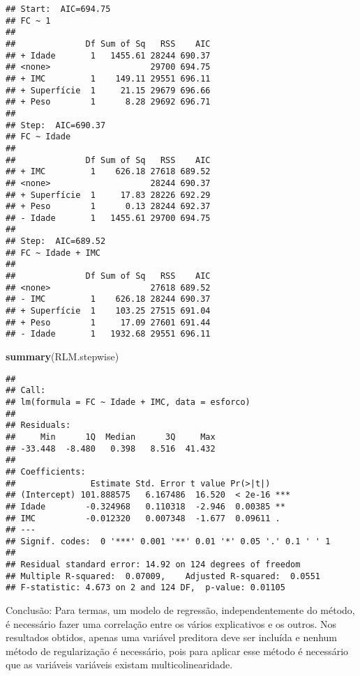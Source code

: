\documentclass[]{article}
\newenvironment{Shaded}{\begin{snugshade}}{\end{snugshade}}
\newcommand{\KeywordTok}[1]{\textcolor[rgb]{0.13,0.29,0.53}{\textbf{#1}}}
\newcommand{\NormalTok}[1]{#1}
\begin{document}
\begin{verbatim}
## Start:  AIC=694.75
## FC ~ 1
## 
##              Df Sum of Sq   RSS    AIC
## + Idade       1   1455.61 28244 690.37
## <none>                    29700 694.75
## + IMC         1    149.11 29551 696.11
## + Superfície  1     21.15 29679 696.66
## + Peso        1      8.28 29692 696.71
## 
## Step:  AIC=690.37
## FC ~ Idade
## 
##              Df Sum of Sq   RSS    AIC
## + IMC         1    626.18 27618 689.52
## <none>                    28244 690.37
## + Superfície  1     17.83 28226 692.29
## + Peso        1      0.13 28244 692.37
## - Idade       1   1455.61 29700 694.75
## 
## Step:  AIC=689.52
## FC ~ Idade + IMC
## 
##              Df Sum of Sq   RSS    AIC
## <none>                    27618 689.52
## - IMC         1    626.18 28244 690.37
## + Superfície  1    103.25 27515 691.04
## + Peso        1     17.09 27601 691.44
## - Idade       1   1932.68 29551 696.11
\end{verbatim}

\begin{Shaded}
\begin{Highlighting}[]
\KeywordTok{summary}\NormalTok{(RLM.stepwise)}
\end{Highlighting}
\end{Shaded}

\begin{verbatim}
## 
## Call:
## lm(formula = FC ~ Idade + IMC, data = esforco)
## 
## Residuals:
##     Min      1Q  Median      3Q     Max 
## -33.448  -8.480   0.398   8.516  41.432 
## 
## Coefficients:
##               Estimate Std. Error t value Pr(>|t|)    
## (Intercept) 101.888575   6.167486  16.520  < 2e-16 ***
## Idade        -0.324968   0.110318  -2.946  0.00385 ** 
## IMC          -0.012320   0.007348  -1.677  0.09611 .  
## ---
## Signif. codes:  0 '***' 0.001 '**' 0.01 '*' 0.05 '.' 0.1 ' ' 1
## 
## Residual standard error: 14.92 on 124 degrees of freedom
## Multiple R-squared:  0.07009,    Adjusted R-squared:  0.0551 
## F-statistic: 4.673 on 2 and 124 DF,  p-value: 0.01105
\end{verbatim}

Conclusão: Para termas, um modelo de regressão, independentemente do
método, é necessário fazer uma correlação entre os vários explicativos e
os outros. Nos resultados obtidos, apenas uma variável preditora deve
ser incluída e nenhum método de regularização é necessário, pois para
aplicar esse método é necessário que as variáveis variáveis existam
multicolinearidade.
\end{document}
